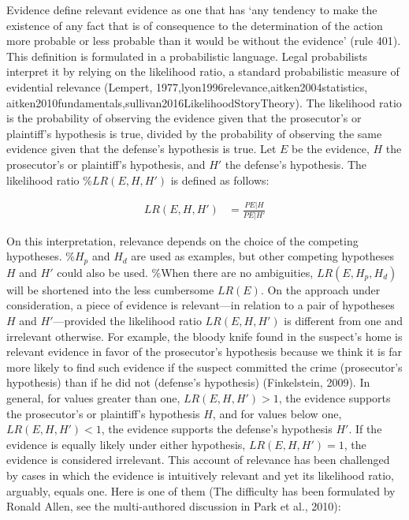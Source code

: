 \documentclass[10pt,dvipsnames,enabledeprecatedfontcommands]{scrartcl}
\begin{document}
Evidence define relevant evidence as one that has `any tendency to make
the existence of any fact that is of consequence to the determination of
the action more probable or less probable than it would be without the
evidence' (rule 401). This definition is formulated in a probabilistic
language. Legal probabilists interpret it by relying on the likelihood
ratio, a standard probabilistic measure of evidential relevance
(Lempert, 1977,lyon1996relevance,aitken2004statistics,
aitken2010fundamentals,sullivan2016LikelihoodStoryTheory). The
likelihood ratio is the probability of observing the evidence given that
the prosecutor's or plaintiff's hypothesis is true, divided by the
probability of observing the same evidence given that the defense's
hypothesis is true. Let \(E\) be the evidence, \(H\) the prosecutor's or
plaintiff's hypothesis, and \(H'\) the defense's hypothesis. The
likelihood ratio \%\(LR(E, H, H')\) is defined as follows:

\begin{align*}LR(E,H,H') & = \frac{P{E\vert H}}{P{E\vert H'}}
\end{align*}

On this interpretation, relevance depends on the choice of the competing
hypotheses. \%\(H_p\) and \(H_d\) are used as examples, but other
competing hypotheses \(H\) and \(H'\) could also be used. \%When there
are no ambiguities, \(LR(E, H_p, H_d)\) will be shortened into the less
cumbersome \(LR(E)\). On the approach under consideration, a piece of
evidence is relevant---in relation to a pair of hypotheses \(H\) and
\(H'\)---provided the likelihood ratio \(LR(E, H, H')\) is different
from one and irrelevant otherwise. For example, the bloody knife found
in the suspect's home is relevant evidence in favor of the prosecutor's
hypothesis because we think it is far more likely to find such evidence
if the suspect committed the crime (prosecutor's hypothesis) than if he
did not (defense's hypothesis) (Finkelstein, 2009). In general, for
values greater than one, \(LR(E, H, H')>1\), the evidence supports the
prosecutor's or plaintiff's hypothesis \(H\), and for values below one,
\(LR(E, H, H')<1\), the evidence supports the defense's hypothesis
\(H'\). If the evidence is equally likely under either hypothesis,
\(LR(E, H, H')=1\), the evidence is considered irrelevant. This account
of relevance has been challenged by cases in which the evidence is
intuitively relevant and yet its likelihood ratio, arguably, equals one.
Here is one of them (The difficulty has been formulated by Ronald Allen,
see the multi-authored discussion in Park et al., 2010):
\end{document}
